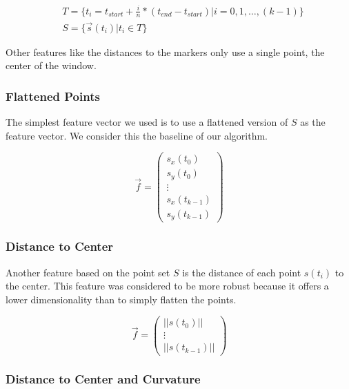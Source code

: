 \documentclass[pdftex,12pt,a4paper]{report}
\begin{document}
\begin{equation}
\begin{split}
& T = \{ t_i=t_{start} + \frac{i}{n} * (t_{end}-t_{start}) | i=0, 1, \dots, (k-1) \} \\
& S = \{ \vec{s}(t_i) | t_i \in T \}
\end{split}
\end{equation}  

Other features like the distances to the markers only use a single point, the center of
the window.

\subsubsection{Flattened Points}
\label{subsub:features-flattened}

The simplest feature vector we used is to use a flattened version of $S$ as the feature
vector. We consider this the baseline of our algorithm.

\begin{equation}
\vec{f} = \left( \begin{array}{c}
s_x(t_0) \\
s_y(t_0) \\
\vdots \\
s_x(t_{k-1}) \\
s_y(t_{k-1})
\end{array} \right)
\end{equation}

\subsubsection{Distance to Center}

Another feature based on the point set $S$ is the distance of each point $s(t_i)$ to the
center. This feature was considered	to be more robust because it offers a lower dimensionality
than to simply flatten the points.

\begin{equation}
\vec{f} = \left( \begin{array}{c}
||s(t_0)|| \\
\vdots \\
||s(t_{k-1})||
\end{array} \right)
\end{equation}

\subsubsection{Distance to Center and Curvature}
\label{subsub:featuredistancetocenterandcurvature}
\end{document}
